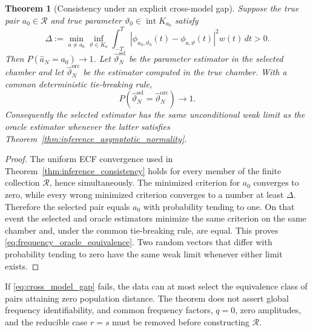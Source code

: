 \documentclass[11pt]{amsart}
\numberwithin{equation}{section}\setcounter{tocdepth}{3}\setcounter{secnumdepth}{3}
\newtheorem{theorem}{Theorem}[section]\newtheorem{proposition}[theorem]{Proposition}
\begin{document}
\begin{theorem}[Consistency under an explicit cross-model gap]
\label{thm:frequency_selection}
Suppose the true pair $a_0\in\mathcal R$ and true parameter
$\vartheta_0\in\operatorname{int}K_{a_0}$ satisfy
\begin{equation}
 \Delta:=\min_{a\ne a_0}\inf_{\vartheta\in K_a}
 \int_{-T}^T|\phi_{a_0,\vartheta_0}(t)-
                 \phi_{a,\vartheta}(t)|^2w(t)\,dt>0.
 \label{eq:cross_model_gap}
\end{equation}
Then $P(\widehat a_N=a_0)\to1$.  Let
$\widehat\vartheta_N^{\mathrm{sel}}$ be the parameter estimator in the selected chamber
and let $\widehat\vartheta_N^{\mathrm{orc}}$ be the estimator computed in the true
chamber.  With a common deterministic tie-breaking rule,
\begin{equation}
 P\!\left(\widehat\vartheta_N^{\mathrm{sel}}
          =\widehat\vartheta_N^{\mathrm{orc}}\right)\longrightarrow1.
 \label{eq:frequency_oracle_equivalence}
\end{equation}
Consequently the selected estimator has the same unconditional weak limit as the oracle
estimator whenever the latter satisfies
Theorem~\ref{thm:inference_asymptotic_normality}.
\end{theorem}
\begin{proof}
The uniform ECF convergence used in Theorem~\ref{thm:inference_consistency} holds for
every member of the finite collection $\mathcal R$, hence simultaneously.  The minimized
criterion for $a_0$ converges to zero, while every wrong minimized criterion converges to
a number at least $\Delta$.  Therefore the selected pair equals $a_0$ with probability
tending to one.  On that event the selected and oracle estimators minimize the same
criterion on the same chamber and, under the common tie-breaking rule, are equal.  This
proves \eqref{eq:frequency_oracle_equivalence}.  Two random vectors that differ with
probability tending to zero have the same weak limit whenever either limit exists.
\end{proof}
If \eqref{eq:cross_model_gap} fails, the data can at most select the equivalence class of
pairs attaining zero population distance.  The theorem does not assert global frequency
identifiability, and common frequency factors, $q=0$, zero amplitudes, and the reducible
case $r=s$ must be removed before constructing $\mathcal R$.
\end{document}
